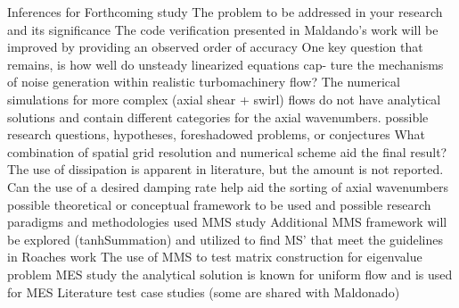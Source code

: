 \documentclass[a4paper]{report}
\begin{document}
\begin{outline}[enumerate]
    \2 Inferences for Forthcoming study
    \3 The problem to be addressed in your research and its significance
    \4 The code verification presented in Maldando's work will be 
    improved by providing an observed order of accuracy
    \4 One key question that remains, is how well do unsteady linearized equations cap-
    ture the mechanisms of noise generation within realistic 
    turbomachinery flow? The numerical simulations for more complex 
    (axial shear + swirl) flows do not have analytical solutions and contain 
    different categories for the axial wavenumbers.  
    \3 possible research questions, hypotheses, foreshadowed problems, or 
    conjectures
    \4 What combination of spatial grid resolution and numerical scheme aid 
    the final result? The use of dissipation is apparent in literature, but the
    amount is not reported. 
    \4 Can the use of a desired damping rate help aid the sorting of axial wavenumbers
    \3 possible theoretical or conceptual framework to be used and
     possible research paradigms and methodologies used
    \4 MMS study 
    \4[-] Additional MMS framework will be explored (tanhSummation) and utilized
    to find MS' that meet the guidelines in Roaches work 
    \4[-] The use of MMS to test matrix construction for eigenvalue problem 
    \4 MES study
    \4[-] the analytical solution is known for uniform flow and is used for
    MES
   \4 Literature test case studies (some are shared with Maldonado)


\end{outline}
\end{document}

